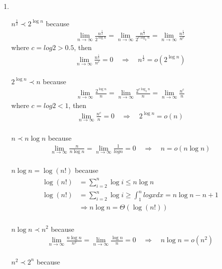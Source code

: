\documentclass[12pt,a4paper]{article}
\makeatletter
\newtheorem*{solution}{Solution}
\theoremstyle{definition}
\renewenvironment{solution}[1][Solution] {\par\pushQED{\qed}\normalfont\topsep6\p@\@plus6\p@\relax\trivlist\item[\hskip\labelsep\bfseries#1\@addpunct{.}]\ignorespaces}{\popQED\endtrivlist\@endpefalse} \makeatother
\makeatother
\begin{document}
\begin{enumerate}
\begin{solution}
\begin{align}
      \end{align}
      ~\\
      $n^{\frac{1}{2}}\prec 2^{\log n}$ because
      \begin{align}
          \lim_{n\to \infty}\frac{n^{\frac{1}{2}}}{2^{\log n}} =\lim_{n\to \infty}\frac{n^{\frac{1}{2}}}{2^{c\log_2 n}} =\lim_{n\to \infty}\frac{n^{\frac{1}{2}}}{n^{c}} 
      \end{align}
      where $c = log2 > 0.5$, then
      \begin{align}
          \lim_{n\to \infty}\frac{n^{\frac{1}{2}}}{n^{c}} = 0 \quad\Rightarrow\quad  n^{\frac{1}{2}} = o(2^{\log n})
      \end{align}
      ~\\
      $ 2^{\log n}\prec n$ because
      \begin{align}
          \lim_{n\to \infty}\frac{2^{\log n}}{n} =\lim_{n\to \infty}\frac{2^{c\log_2 n}}{n}=\lim_{n\to \infty}\frac{n^c}{n}
      \end{align}
      where $c = log2 <1$, then
      \begin{align}
          \lim_{n\to \infty}\frac{n^c}{n} = 0 \quad\Rightarrow\quad 2^{\log n} = o(n)
      \end{align}
      ~\\
      $n\prec n\log n$ because
      \begin{align}
          \lim_{n\to \infty}\frac{n}{n\log n} =\lim_{n\to \infty}\frac{1}{log n}=0 \quad\Rightarrow\quad n = o(n\log n)
      \end{align}
      ~\\
      $n \log n=\log(n!)$ because
      \begin{align}
      \begin{split}
          \log(n!) &= \sum_{i=2}^n \log i \leq n \log n\\
          \log(n!) &= \sum_{i=2}^n \log i \ge \int_1^n log x dx = n\log n - n +1\\
          &\Rightarrow n \log n=\Theta(\log(n!))
      \end{split}
      \end{align}
      ~\\
      $ n\log n\prec n^2$ because
      \begin{align}
          \lim_{n\to \infty}\frac{n\log n}{n^2} =\lim_{n\to \infty}\frac{\log n}{n}=0 \quad\Rightarrow\quad n\log n = o(n^2)
      \end{align}
      ~\\
      $ n^2\prec 2^n$ because
      \begin{align}

\end{align}
\end{solution}
\end{enumerate}
\end{document}
